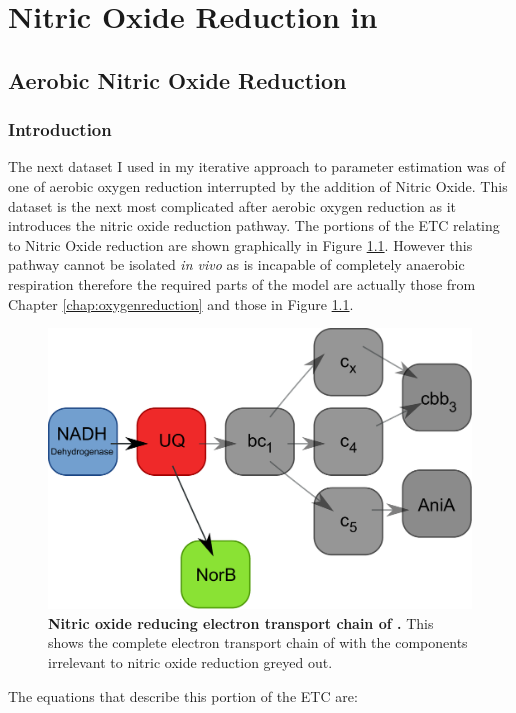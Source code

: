 \chapter{Nitric Oxide Reduction in \Nm{}}
\label{chap:noreduction}
\section{Aerobic Nitric Oxide Reduction}
\subsection{Introduction}
The next dataset I used in my iterative approach to parameter estimation was of one of aerobic oxygen reduction interrupted by the addition of Nitric Oxide. This dataset is the next most complicated after aerobic oxygen reduction as it introduces the nitric oxide reduction pathway. The portions of the ETC relating to Nitric Oxide reduction are shown graphically in Figure \ref{fig:no_resp_chain}. However this pathway cannot be isolated \textit{in vivo} as \Nm{} is incapable of completely anaerobic respiration therefore the required parts of the model are actually those from Chapter \ref{chap:oxygenreduction} and those in Figure \ref{fig:no_resp_chain}.
\begin{figure}[tbp]
  \centering
    \includegraphics[width=14cm]{06-noreduction/data/no_resp_chain.pdf}
    \caption[Nitric oxide reducing electron transport chain of \Nm{}]{{\bf Nitric oxide reducing electron transport chain of \Nm{}.} This shows the complete electron transport chain of \Nsm{} with the components irrelevant to nitric oxide reduction greyed out.
  \label{fig:no_resp_chain}}
\end{figure}
The equations that describe this portion of the ETC are:
